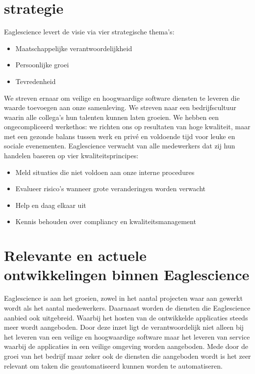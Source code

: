 \section{strategie}
Eaglescience levert de visie via vier strategische thema's:
\begin{itemize}
\item Maatschappelijke verantwoordelijkheid
\item Persoonlijke groei
\item Tevredenheid
\end{itemize}
We streven ernaar om veilige en hoogwaardige software diensten te leveren die waarde toevoegen aan onze samenleving. We streven naar een bedrijfscultuur waarin alle collega's hun talenten kunnen laten groeien. We hebben een ongecompliceerd werkethos: we richten ons op resultaten van hoge kwaliteit, maar met een gezonde balans tussen werk en priv\'e en voldoende tijd voor leuke en sociale evenementen. Eaglescience verwacht van alle medewerkers dat zij hun handelen baseren op vier kwaliteitsprincipes:
\begin{itemize}
\item Meld situaties die niet voldoen aan onze interne procedures
\item Evalueer risico's wanneer grote veranderingen worden verwacht
\item Help en daag elkaar uit
\item Kennis behouden over compliancy en kwaliteitsmanagement
\end{itemize} 
\section{Relevante en actuele ontwikkelingen binnen Eaglescience}
Eaglescience is aan het groeien, zowel in het aantal projecten waar aan gewerkt wordt als het aantal medewerkers. Daarnaast worden de diensten die Eaglescience aanbied ook uitgebreid. Waarbij het hosten van de ontwikkelde applicaties steeds meer wordt aangeboden. Door deze inzet ligt de verantwoordelijk niet alleen bij het leveren van een veilige en hoogwaardige software maar het leveren van service waarbij de applicaties in een veilige omgeving worden aangeboden. Mede door de groei van het bedrijf maar zeker ook de diensten die aangeboden wordt is het zeer relevant om taken die geautomatiseerd kunnen worden te automatiseren.
